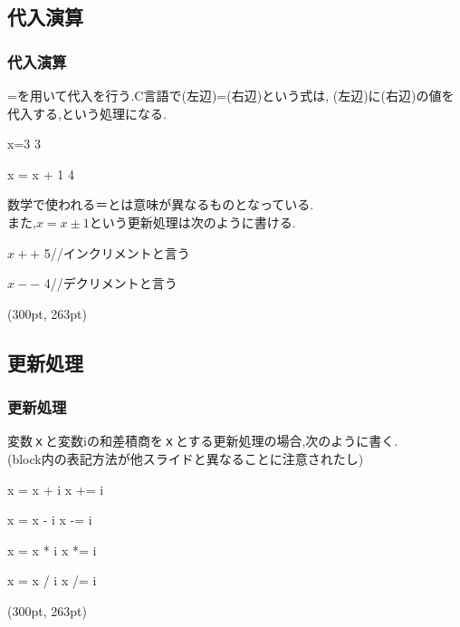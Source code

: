 \documentclass[dvipdfmx]{beamer}
\begin{document}
\subsection{代入演算}
\begin{frame}[t, label=17]
    \frametitle{代入演算}
    =を用いて代入を行う.C言語で(左辺)=(右辺)という式は,
    (左辺)に(右辺)の値を代入する,という処理になる.
    \begin{block}{x=3}
        3
    \end{block}
    \begin{block}{x = x + 1}
        4
    \end{block}
    数学で使われる＝とは意味が異なるものとなっている.\\
    また,$x=x\pm 1$という更新処理は次のように書ける.
    \begin{block}{$x++$}
        5\qquad //インクリメントと言う
    \end{block}
    \begin{block}{$x--$}
        4\qquad //デクリメントと言う
    \end{block}
    \begin{textblock*}{0.3\linewidth}(300pt, 263pt)
    \hyperlink{16}{}
    \space
    \hyperlink{18}{}
    \end{textblock*}
\end{frame}

\subsection{更新処理}
\begin{frame}[t, label=18]
    \frametitle{更新処理}
    変数ｘと変数iの和差積商をｘとする更新処理の場合,次のように書く.\\
    (block内の表記方法が他スライドと異なることに注意されたし)
    \begin{exampleblock}{x = x + i}
        x += i 
    \end{exampleblock}
    \begin{exampleblock}{x = x - i}
        x -= i
    \end{exampleblock}
    \begin{exampleblock}{x = x * i}
        x *= i
    \end{exampleblock}
    \begin{exampleblock}{x = x / i}
        x /= i
    \end{exampleblock}
    \begin{textblock*}{0.3\linewidth}(300pt, 263pt)
    \hyperlink{17}{}
    \space
    \hyperlink{19}{}
    \end{textblock*}
\end{frame}
\end{document}
